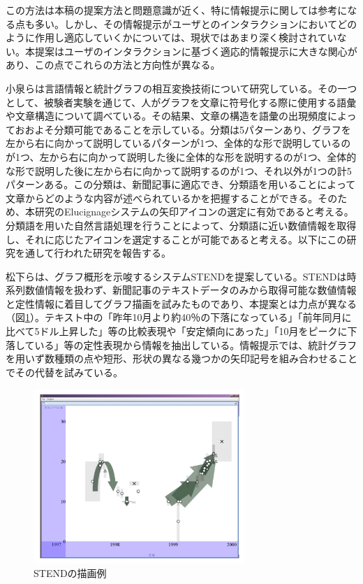 \documentclass{matsushita-zemi}
\begin{document}
この方法は本稿の提案方法と問題意識が近く、特に情報提示に関しては参考になる点も多い。しかし、その情報提示がユーザとのインタラクションにおいてどのように作用し適応していくかについては、現状ではあまり深く検討されていない。本提案はユーザのインタラクションに基づく適応的情報提示に大きな関心があり、この点でこれらの方法と方向性が異なる。

小泉らは言語情報と統計グラフの相互変換技術について研究している\cite{interconversion}。その一つとして、被験者実験を通じて、人がグラフを文章に符号化する際に使用する語彙や文章構造について調べている。その結果、文章の構造を語彙の出現頻度によっておおよそ分類可能であることを示している。分類は5パターンあり、グラフを左から右に向かって説明しているパターンが1つ、全体的な形で説明しているのが1つ、左から右に向かって説明した後に全体的な形を説明するのが1つ、全体的な形で説明した後に左から右に向かって説明するのが1つ、それ以外が1つの計5パターンある。この分類は、新聞記事に適応でき、分類語を用いることによって文章からどのような内容が述べられているかを把握することができる。そのため、本研究のElucignageシステムの矢印アイコンの選定に有効であると考える。分類語を用いた自然言語処理を行うことによって、分類語に近い数値情報を取得し、それに応じたアイコンを選定することが可能であると考える。以下にこの研究を通して行われた研究を報告する。

松下らは、グラフ概形を示唆するシステムSTENDを提案している\cite{STEND}。STENDは時系列数値情報を扱わず、新聞記事のテキストデータのみから取得可能な数値情報と定性情報に着目してグラフ描画を試みたものであり、本提案とは力点が異なる（図\ref{STEND}）。テキスト中の「昨年10月より約40％の下落になっている」「前年同月に比べて5ドル上昇した」等の比較表現や「安定傾向にあった」「10月をピークに下落している」等の定性表現から情報を抽出している。情報提示では、統計グラフを用いず数種類の点や短形、形状の異なる幾つかの矢印記号を組み合わせることでその代替を試みている。
\begin{figure}[tb]
  \begin{center}
   \includegraphics[width=8cm,bb=0 0 512 422]{STEND.PNG}
  \end{center}
 \caption{STENDの描画例}
 \label{STEND}
\end{figure}
\end{document}
